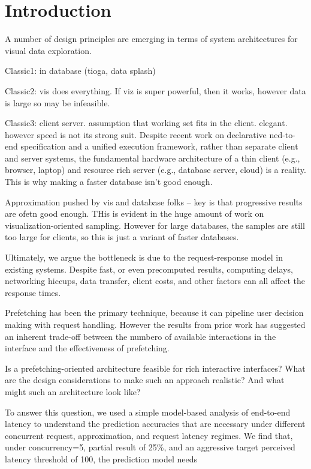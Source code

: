 
\section{Introduction}

\label{s:intro}

A number of design principles are emerging in terms of system architectures
for visual data exploration.

Classic1: in database (tioga, data splash)

Classic2: vis does everything.  If viz is super powerful, then it works, however data is large so may be infeasible.

Classic3: client server.  assumption that working set fits in the client.  elegant.  however speed is not its strong suit.
Despite recent work on declarative ned-to-end specification and a unified execution framework, rather than separate client and server systems, the fundamental hardware architecture of a thin client (e.g., browser, laptop) and resource rich server (e.g., database server, cloud) is a reality.
This is why making a faster database isn't good enough.

Approximation pushed by vis and database folks -- key is that progressive results are ofetn good enough.  THis is evident in the huge amount of work on visualization-oriented sampling.  However for large databases, the samples are still too large for clients, so this is just a variant of faster databases.

Ultimately, we argue the bottleneck is due to the request-response model in existing systems.    Despite fast, or even precomputed results, computing delays, networking hiccups, data transfer, client costs, and other factors can all affect the response times.

Prefetching has been the primary technique, because it can pipeline user decision making with request handling.  However the results from prior work has suggested an inherent trade-off between the numbero of available interactions in the interface and the effectiveness of prefetching.

Is a prefetching-oriented architecture feasible for rich interactive interfaces?  What are the design considerations to make such an approach realistic?  And what might such an architecture look like?

To answer this question, we used a simple model-based analysis of end-to-end latency to understand the prediction accuracies that are necessary under different concurrent request, approximation, and request latency regimes.  We find that, under concurrency=5, partial result of 25\%, and an aggressive target perceived latency threshold of 100, the prediction model needs 

